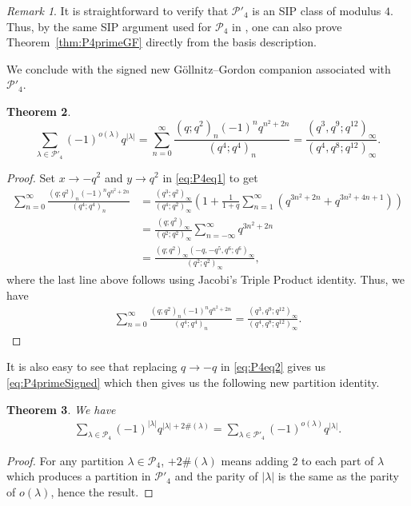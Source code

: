 \documentclass[11pt]{amsart}
\newtheorem{theorem}{Theorem}[section]
\theoremstyle{definition}
\theoremstyle{remark}
\newtheorem{remark}[theorem]{Remark}
\numberwithin{equation}{section}
\begin{document}
\begin{remark}
It is straightforward to verify that $\mathcal{P}'_4$ is an SIP class of modulus $4$. Thus, by the same SIP argument used for $\mathcal{P}_4$ in \cite{DGLSIPI}, one can also prove Theorem~\ref{thm:P4primeGF} directly from the basis description.
\end{remark}
We conclude with the signed new G\"ollnitz--Gordon companion associated with $\mathcal{P}'_4$.
\begin{theorem}
\begin{equation}\label{eq:P4primeSigned}
\sum_{\lambda\in\mathcal{P}'_4}(-1)^{o(\lambda)}q^{|\lambda|}=\sum_{n=0}^{\infty}\frac{(q;q^2)_{n}(-1)^nq^{n^2+2n}}{(q^4;q^4)_{n}}=\frac{(q^3,q^9;q^{12})_{\infty}}{(q^4,q^8;q^{12})_{\infty}}.
\end{equation}
\end{theorem}

\begin{proof}
Set $x\to -q^2$ and $y\to q^2$ in \eqref{eq:P4eq1} to get
\begin{align*}
\sum\limits_{n=0}^{\infty}\frac{(q;q^2)_n(-1)^nq^{n^2+2n}}{(q^4;q^4)_n} &= \frac{(q^3;q^2)_{\infty}}{(q^4;q^2)_{\infty}}\left(1+\frac{1}{1+q}\sum\limits_{n=1}^{\infty}\left(q^{3n^2+2n}+q^{3n^2+4n+1}\right)\right)\\
&= \frac{(q;q^2)_{\infty}}{(q^2;q^2)_{\infty}}\sum\limits_{n=-\infty}^{\infty}q^{3n^2+2n}\\
&= \frac{(q;q^2)_{\infty}(-q,-q^5,q^6;q^6)_{\infty}}{(q^2;q^2)_{\infty}},
\end{align*}
where the last line above follows using Jacobi's Triple Product identity. Thus, we have
\begin{align*}
\sum\limits_{n=0}^{\infty}\frac{(q;q^2)_n(-1)^nq^{n^2+2n}}{(q^4;q^4)_n} = \frac{(q^3,q^9;q^{12})_{\infty}}{(q^4,q^8;q^{12})_{\infty}}.
\end{align*}
\end{proof}

It is also easy to see that replacing $q\rightarrow -q$ in \eqref{eq:P4eq2} gives us \eqref{eq:P4primeSigned} which then gives us the following new partition identity.
\begin{theorem}
We have
\begin{align*}
\sum\limits_{\lambda\in\mathcal{P}_4}(-1)^{|\lambda|}q^{|\lambda|+2\#(\lambda)} = \sum\limits_{\lambda\in\mathcal{P}'_4}(-1)^{o(\lambda)}q^{|\lambda|}.
\end{align*}
\end{theorem}
\begin{proof}
For any partition $\lambda\in\mathcal{P}_4$, $+2\#(\lambda)$ means adding $2$ to each part of $\lambda$ which produces a partition in $\mathcal{P}'_4$ and the parity of $|\lambda|$ is the same as the parity of $o(\lambda)$, hence the result.
\end{proof}
\end{document}
